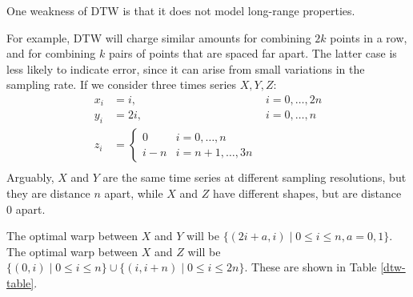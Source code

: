 One weakness of DTW is that it does not model long-range
properties. 

\begin{ex}
\label{stretch-problem}
For example, DTW will charge similar amounts for combining $2k$ points
in a row, and for combining $k$ pairs of points that are spaced far
apart. The latter case is less likely to indicate error, since it can
arise from small variations in the sampling rate. If we consider three
times series $X,Y,Z$:
\begin{align*}
x_i &= i, &i=0, \dots, 2n\\
y_i &= 2i, &i=0, \dots, n\\
z_i &= \begin{cases} 0 & i=0,\dots, n\\ i-n & i=n+1, \dots, 3n\end{cases}\\
\end{align*}
Arguably, $X$ and $Y$ are the same time series at different sampling
resolutions, but they are distance $n$ apart, while $X$ and $Z$ have
different shapes, but are distance $0$ apart.

The optimal warp between $X$ and $Y$ will be $\{(2i+a,i) \mid 0\le i
\le n, a=0,1\}$. The optimal warp between $X$ and $Z$ will be $\{(0,i)
\mid 0\le i \le n\} \cup \{(i,i+n) \mid 0\le i \le 2n \}$. These are
shown in Table \ref{dtw-table}.
\end{ex}

